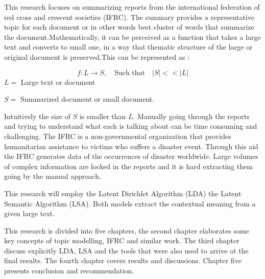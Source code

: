 This research focuses on summarizing reports from the international federation of red cross and crescent societies (IFRC). The summary provides  a  representative topic for each document or in other words best cluster of words that summarize the document.Mathematically, it can be perceived as a function that takes a large text and converts to small one, in a way that thematic structure of the large or original document is preserved.This can be represented as :

$$f:L \longrightarrow S, \quad \text{Such that} \quad |S|<< |L|$$
$L=$ Large text or document

 $S=$ Summarized document or small document.
  
Intuitively the size of $S$ is smaller than $L$.
Manually going through the reports and trying to understand what each is talking about can be time consuming and challenging. The IFRC is a non-governmental organization
that provides humanitarian assistance to victims who suffers a disaster event. Through this aid the 	IFRC generates data of the occurrences of disaster worldwide. Large volumes of complex information    are locked in the reports and it is hard extracting them going by the manual approach. 

This research will employ the Latent Dirichlet Algorithm (LDA)
the Latent Semantic Algorithm (LSA). Both models extract the contextual meaning from a given large text. 

This research is divided into five chapters, the second chapter elaborates some key concepts of topic modelling, IFRC and similar work. The third chapter discuss explicitly LDA, LSA and the tools that were also used to arrive at the final results. The fourth chapter covers results and discussions. Chapter five presents conclusion and recommendation.

  
